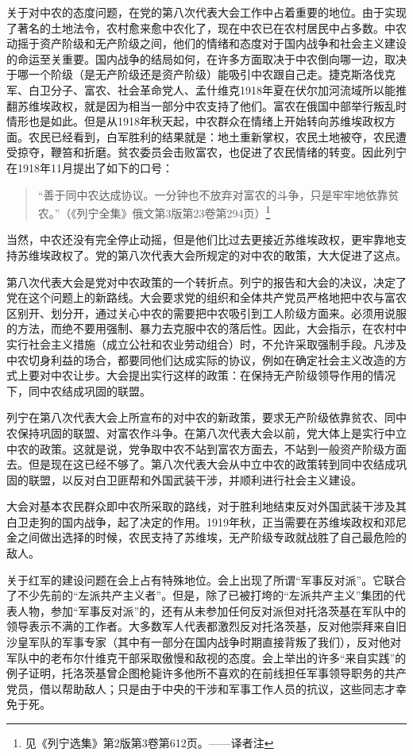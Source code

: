 关于对中农的态度问题，在党的第八次代表大会工作中占着重要的地位。由于实现了著名的土地法令，农村愈来愈中农化了，现在中农已在农村居民中占多数。中农动摇于资产阶级和无产阶级之间，他们的情绪和态度对于国内战争和社会主义建设的命运至关重要。国内战争的结局如何，在许多方面取决于中农倒向哪一边，取决于哪一个阶级（是无产阶级还是资产阶级）能吸引中农跟自己走。捷克斯洛伐克军、白卫分子、富农、社会革命党人、孟什维克1918年夏在伏尔加河流域所以能推翻苏维埃政权，就是因为相当一部分中农支持了他们。富农在俄国中部举行叛乱时情形也是如此。但是从1918年秋天起，中农群众在情绪上开始转向苏维埃政权方面。农民已经看到，白军胜利的结果就是：地土重新掌权，农民土地被夺，农民遭受掠夺，鞭笞和折磨。贫农委员会击败富农，也促进了农民情绪的转变。因此列宁在1918年11月提出了如下的口号：

\begin{quotation}
“善于同中农达成协议。一分钟也不放弃对富农的斗争，只是牢牢地依靠贫农。”（《列宁全集》俄文第3版第23卷第294页）\footnote{见《列宁选集》第2版第3卷第612页。——译者注}
\end{quotation}

当然，中农还没有完全停止动摇，但是他们比过去更接近苏维埃政权，更牢靠地支持苏维埃政权了。党的第八次代表大会所规定的对中农的敢策，大大促进了这点。

第八次代表大会是党对中农政策的一个转折点。列宁的报告和大会的决议，决定了党在这个问题上的新路线。大会要求党的组织和全体共产党员严格地把中农与富农区别开、划分开，通过关心中农的需要把中农吸引到工人阶级方面来。必须用说服的方法，而绝不要用强制、暴力去克服中农的落后性。因此，大会指示，在农村中实行社会主义措施（成立公社和农业劳动组合）时，不允许采取强制手段。凡涉及中农切身利益的场合，都要同他们达成实际的协议，例如在确定社会主义改造的方式上要对中农让步。大会提出实行这样的政策：在保持无产阶级领导作用的情况下，同中农结成巩固的联盟。

列宁在第八次代表大会上所宣布的对中农的新政策，要求无产阶级依靠贫农、同中农保持巩固的联盟、对富农作斗争。在第八次代表大会以前，党大体上是实行中立中农的政策。这就是说，党争取中农不站到富农方面去，不站到一般资产阶级方面去。但是现在这已经不够了。第八次代表大会从中立中农的政策转到同中农结成巩固的联盟，以反对白卫匪帮和外国武装干涉，并顺利进行社会主义建设。

大会对基本农民群众即中农所采取的路线，对于胜利地结束反对外国武装干涉及其白卫走狗的国内战争，起了决定的作用。1919年秋，正当需要在苏维埃政权和邓尼金之间做出选择的时候，农民支持了苏维埃，无产阶级专政就战胜了自己最危险的敌人。

关于红军的建设问题在会上占有特殊地位。会上出现了所谓“军事反对派”。它联合了不少先前的“左派共产主义者”。但是，除了已被打垮的“左派共产主义”集团的代表人物，参加“军事反对派”的，还有从未参加任何反对派但对托洛茨基在军队中的领导表示不满的工作者。大多数军人代表都激烈反对托洛茨基，反对他崇拜来自旧沙皇军队的军事专家（其中有一部分在国内战争时期直接背叛了我们），反对他对军队中的老布尔什维克干部采取傲慢和敌视的态度。会上举出的许多“来自实践”的例子证明，托洛茨基曾企图枪毙许多他所不喜欢的在前线担任军事领导职务的共产党员，借以帮助敌人；只是由于中央的干涉和军事工作人员的抗议，这些同志才幸免于死。

